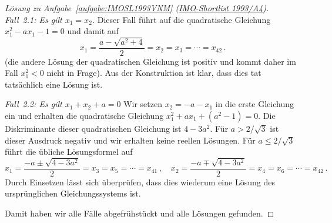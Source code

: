 \begin{proof}[Lösung zu Aufgabe~\ref{aufgabe:IMOSL1993VNM} \textmd{(\href{https://artofproblemsolving.com/community/c3944_1993_imo_shortlist}{IMO-Shortlist 1993/A4})}]
	\emph{Fall~2.1: Es gilt $x_1=x_2$.} Dieser Fall führt auf die quadratische Gleichung $x_1^2-ax_1-1=0$ und damit auf
	\begin{equation*}
		x_1=\frac{a-\sqrt{a^2+4}}2=x_2=x_3=\dotsb=x_{42}\,.
	\end{equation*}
	(die andere Lösung der quadratischen Gleichung ist positiv und kommt daher im Fall $x_1^2<0$ nicht in Frage). Aus der Konstruktion ist klar, dass dies tat tatsächlich eine Lösung ist.
	
	\emph{Fall~2.2: Es gilt $x_1+x_2+a=0$} Wir setzen $x_2=-a-x_1$ in die erste Gleichung ein und erhalten die quadratische Gleichung $x_1^2+ax_1+(a^2-1)=0$. Die Diskriminante dieser quadratischen Gleichung ist $4-3a^2$. Für $a>{2}/{\sqrt{3}}$ ist dieser Ausdruck negativ und wir erhalten keine reellen Lösungen. Für $a\leqslant {2}/{\sqrt{3}}$ führt die übliche Lösungsformel auf 
	\begin{equation*}
		x_1=\frac{-a\pm\sqrt{4-3a^2}}2=x_3=x_5=\dotsb=x_{41}\,,\quad x_2=\frac{-a\mp\sqrt{4-3a^2}}2=x_4=x_6=\dotsb=x_{42}\,.
	\end{equation*}
	Durch Einsetzen lässt sich überprüfen, dass dies wiederum eine Lösung des ursprünglichen Gleichungssystems ist.
	
	Damit haben wir alle Fälle abgefrühstückt und alle Lösungen gefunden.
\end{proof}